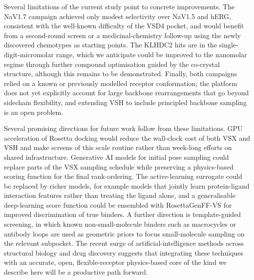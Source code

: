 \documentclass[11pt]{article}
\begin{document}
Several limitations of the current study point to concrete improvements.
The NaV1.7 campaign achieved only modest selectivity over NaV1.5 and
hERG, consistent with the well-known difficulty of the VSD4 pocket, and
would benefit from a second-round screen or a medicinal-chemistry
follow-up using the newly discovered chemotypes as starting points.
The KLHDC2 hits are in the single-digit-micromolar range, which we
anticipate could be improved to the nanomolar regime through further
compound optimisation guided by the co-crystal structure, although this
remains to be demonstrated. Finally, both campaigns relied on a known or
previously modelled receptor conformation; the platform does not yet
explicitly account for large backbone rearrangements that go beyond
sidechain flexibility, and extending VSH to include principled
backbone sampling is an open problem.

Several promising directions for future work follow from these
limitations. GPU acceleration of Rosetta docking would reduce the
wall-clock cost of both VSX and VSH and make screens of this scale
routine rather than week-long efforts on shared infrastructure.
Generative AI models for initial pose sampling could replace parts of the
VSX sampling schedule while preserving a physics-based scoring function
for the final rank-ordering. The active-learning surrogate could be
replaced by richer models, for example models that jointly learn
protein-ligand interaction features rather than treating the ligand
alone, and a generalisable deep-learning score function could be
ensembled with RosettaGenFF-VS for improved discrimination of true
binders. A further direction is template-guided screening, in which
known non-small-molecule binders such as macrocycles or antibody loops
are used as geometric priors to focus small-molecule sampling on the
relevant subpocket. The recent surge of artificial-intelligence methods
across structural biology and drug discovery suggests that integrating
these techniques with an accurate, open, flexible-receptor physics-based
core of the kind we describe here will be a productive path forward.
\end{document}
